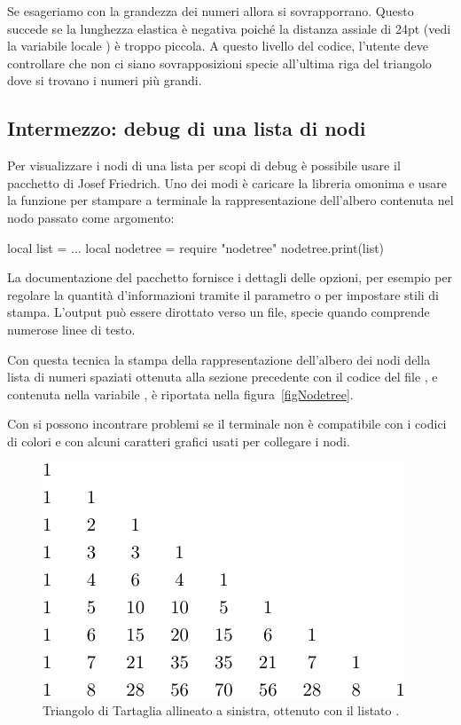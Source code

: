 Se esageriamo con la grandezza dei numeri allora si sovrapporrano. Questo
succede se la lunghezza elastica è negativa poiché la distanza assiale di 24pt
(vedi la variabile locale ) è troppo piccola. A questo livello del
codice, l'utente deve controllare che non ci siano sovrapposizioni specie
all'ultima riga del triangolo dove si trovano i numeri più grandi.


\subsection{Intermezzo: debug di una lista di nodi}

Per visualizzare i nodi di una lista per scopi di debug è possibile usare il
pacchetto  \cite{pkg:nodetree} di Josef Friedrich. Uno dei modi è
caricare la libreria omonima e usare la funzione
 per stampare a terminale la
rappresentazione dell'albero contenuta nel nodo passato come argomento:
\begin{lines}
local list = ...
local nodetree = require "nodetree"
nodetree.print(list)
\end{lines}

La documentazione del pacchetto fornisce i dettagli delle opzioni, per esempio
per regolare la quantità d'informazioni tramite il parametro  o
per impostare stili di stampa. L'output può essere dirottato verso un file,
specie quando comprende numerose linee di testo.

Con questa tecnica la stampa della rappresentazione dell'albero dei nodi della
lista di numeri spaziati ottenuta alla sezione precedente con il codice del file
, e contenuta nella variabile , è riportata nella
figura~\ref{figNodetree}.

Con  si possono incontrare problemi se il terminale non è
compatibile con i codici di colori e con alcuni caratteri grafici usati per
collegare i nodi.


\begin{figure}[b]
\centering
\includegraphics{image/tart-left}
\caption{Triangolo di Tartaglia allineato a sinistra, ottenuto con il listato
.}
\label{figTriangoloTartagliaLeft}
\end{figure}

